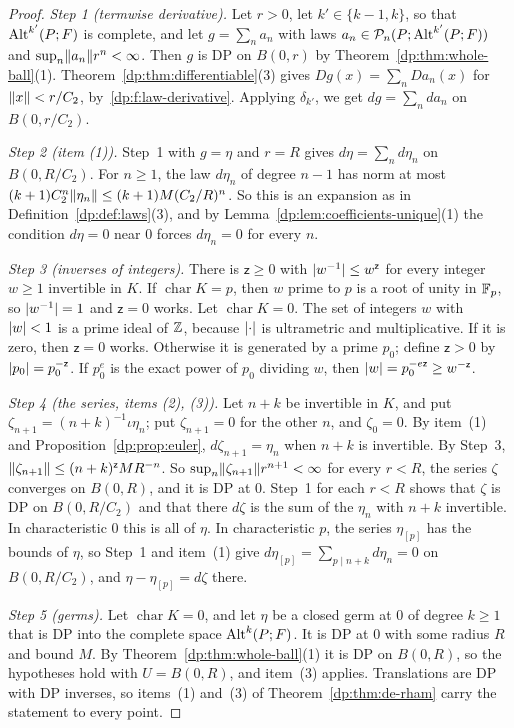 \begin{proof}
\emph{Step 1 (termwise derivative).} Let $r>0$, let $k'\in\{k-1,k\}$, so that $\operatorname{Alt}^{k'}(P;F)$ is complete, and let $g=\sum_na_n$ with laws $a_n\in\mathcal P_n(P;\operatorname{Alt}^{k'}(P;F))$ and $\sup_n\lVert a_n\rVert r^n<\infty$. Then $g$ is DP on $B(0,r)$ by Theorem~\ref{dp:thm:whole-ball}(1). Theorem~\ref{dp:thm:differentiable}(3) gives $Dg(x)=\sum_nDa_n(x)$ for $\lVert x\rVert<r/C_2$, by~\eqref{dp:f:law-derivative}. Applying $\delta_{k'}$, we get $dg=\sum_nda_n$ on $B(0,r/C_2)$.

\emph{Step 2 (item (1)).} Step~1 with $g=\eta$ and $r=R$ gives $d\eta=\sum_nd\eta_n$ on $B(0,R/C_2)$. For $n\ge1$, the law $d\eta_n$ of degree $n-1$ has norm at most $(k+1)C_2^n\lVert \eta_n\rVert\le(k+1)M(C_2/R)^n$. So this is an expansion as in Definition~\ref{dp:def:laws}(3), and by Lemma~\ref{dp:lem:coefficients-unique}(1) the condition $d\eta=0$ near $0$ forces $d\eta_n=0$ for every $n$.

\emph{Step 3 (inverses of integers).} There is $\mathsf z\ge0$ with $\lvert w^{-1}\rvert\le w^{\mathsf z}$ for every integer $w\ge1$ invertible in $K$. If $\operatorname{char}K=p$, then $w$ prime to $p$ is a root of unity in $\mathbb F_p$, so $\lvert w^{-1}\rvert=1$ and $\mathsf z=0$ works. Let $\operatorname{char}K=0$. The set of integers $w$ with $\lvert w\rvert<1$ is a prime ideal of $\mathbb Z$, because $\lvert \cdot\rvert$ is ultrametric and multiplicative. If it is zero, then $\mathsf z=0$ works. Otherwise it is generated by a prime $p_0$; define $\mathsf z>0$ by $\lvert p_0\rvert=p_0^{-\mathsf z}$. If $p_0^e$ is the exact power of $p_0$ dividing $w$, then $\lvert w\rvert=p_0^{-e\mathsf z}\ge w^{-\mathsf z}$.

\emph{Step 4 (the series, items (2), (3)).} Let $n+k$ be invertible in $K$, and put $\zeta_{n+1}=(n+k)^{-1}\iota\eta_n$; put $\zeta_{n+1}=0$ for the other $n$, and $\zeta_0=0$. By item~(1) and Proposition~\ref{dp:prop:euler}, $d\zeta_{n+1}=\eta_n$ when $n+k$ is invertible. By Step~3, $\lVert \zeta_{n+1}\rVert\le(n+k)^{\mathsf z}MR^{-n}$. So $\sup_n\lVert \zeta_{n+1}\rVert r^{n+1}<\infty$ for every $r<R$, the series $\zeta$ converges on $B(0,R)$, and it is DP at $0$. Step~1 for each $r<R$ shows that $\zeta$ is DP on $B(0,R/C_2)$ and that there $d\zeta$ is the sum of the $\eta_n$ with $n+k$ invertible. In characteristic $0$ this is all of $\eta$. In characteristic $p$, the series $\eta_{[p]}$ has the bounds of $\eta$, so Step~1 and item~(1) give $d\eta_{[p]}=\sum_{p\mid n+k}d\eta_n=0$ on $B(0,R/C_2)$, and $\eta-\eta_{[p]}=d\zeta$ there.

\emph{Step 5 (germs).} Let $\operatorname{char}K=0$, and let $\eta$ be a closed germ at $0$ of degree $k\ge1$ that is DP into the complete space $\operatorname{Alt}^k(P;F)$. It is DP at $0$ with some radius $R$ and bound $M$. By Theorem~\ref{dp:thm:whole-ball}(1) it is DP on $B(0,R)$, so the hypotheses hold with $U=B(0,R)$, and item~(3) applies. Translations are DP with DP inverses, so items~(1) and~(3) of Theorem~\ref{dp:thm:de-rham} carry the statement to every point.
\end{proof}
